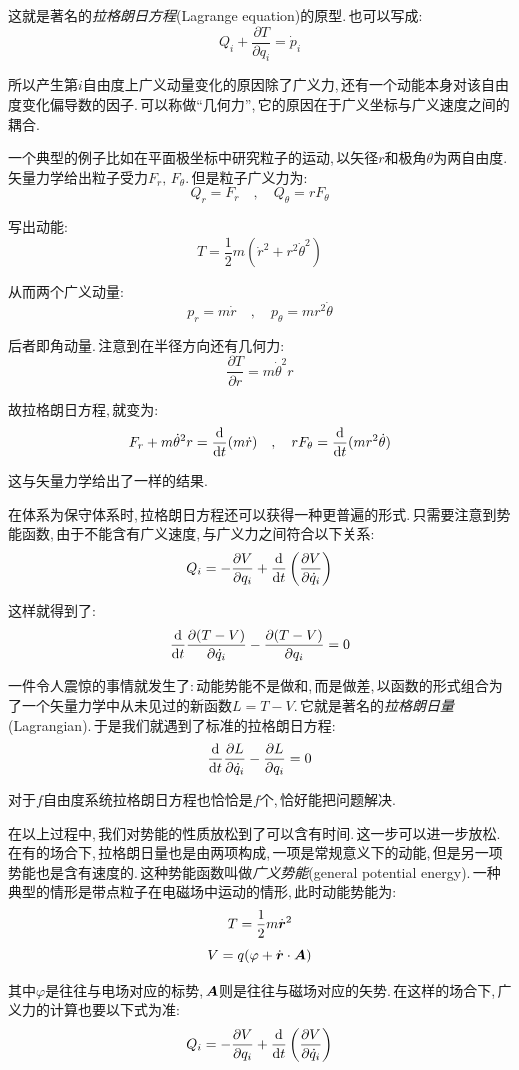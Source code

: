 这就是著名的\emph{拉格朗日方程}(Lagrange equation)的原型.\,也可以写成:
\[Q_i+\frac{\partial T}{\partial q_i}=\dot{p}_i\]

所以产生第$i$自由度上广义动量变化的原因除了广义力,\,还有一个动能本身对该自由度变化偏导数的因子.\,可以称做``几何力'',\,它的原因在于广义坐标与广义速度之间的耦合.

一个典型的例子比如在平面极坐标中研究粒子的运动,\,以矢径$r$和极角$\theta$为两自由度.\,矢量力学给出粒子受力$F_r,\,F_\theta$.\,但是粒子广义力为:
\[Q_r=F_r\quad,\quad Q_\theta=rF_\theta\]

写出动能:
\[T=\frac{1}{2}m(\dot{r}^2+r^2\dot{\theta}^2)\]

从而两个广义动量:
\[p_r=m\dot{r}\quad,\quad p_\theta=mr^2\dot{\theta}\]

后者即角动量.\,注意到在半径方向还有几何力:
\[\frac{\partial T}{\partial r}=m\dot{\theta}^2r\]

故拉格朗日方程,\,就变为:
\[F_r+m\dot{\theta}^2r=\frac{\textrm{d}}{\textrm{d} t}(m\dot{r})\quad ,\quad rF_\theta =\frac{\textrm{d}}{\textrm{d} t}(mr^2\dot{\theta})\]

这与矢量力学给出了一样的结果.

\vspace{1cm}
在体系为保守体系时,\,拉格朗日方程还可以获得一种更普遍的形式.\,只需要注意到势能函数,\,由于不能含有广义速度,\,与广义力之间符合以下关系:
\[Q_i=-\frac{\partial V}{\partial q_i}+\frac{\textrm{d} }{\textrm{d} t}\left(\frac{\partial V}{\partial \dot{q}_i}\right)\]

这样就得到了:
\[\frac{\textrm{d} }{\textrm{d} t}\frac{\partial (T-V)}{\partial \dot{q}_i}-\frac{\partial (T-V)}{\partial q_i}=0\]

一件令人震惊的事情就发生了:\,动能势能不是做和,\,而是做差,\,以函数的形式组合为了一个矢量力学中从未见过的新函数$L=T-V$.\,它就是著名的\emph{拉格朗日量}(Lagrangian).\,于是我们就遇到了标准的拉格朗日方程:
\[\frac{\textrm{d} }{\textrm{d} t}\frac{\partial L}{\partial \dot{q}_i}-\frac{\partial L}{\partial q_i}=0\]

对于$f$自由度系统拉格朗日方程也恰恰是$f$个,\,恰好能把问题解决.

在以上过程中,\,我们对势能的性质放松到了可以含有时间.\,这一步可以进一步放松.\,在有的场合下,\,拉格朗日量也是由两项构成,\,一项是常规意义下的动能,\,但是另一项势能也是含有速度的.\,这种势能函数叫做\emph{广义势能}(general potential energy).\,一种典型的情形是带点粒子在电磁场中运动的情形,\,此时动能势能为:
\[T=\frac{1}{2}m\dot{\boldsymbol{r}}^2\]
\[V=q(\varphi+\dot{\boldsymbol{r}}\cdot \boldsymbol{A})\]

其中$\varphi$是往往与电场对应的标势,\,$\boldsymbol{A}$则是往往与磁场对应的矢势.\,在这样的场合下,\,广义力的计算也要以下式为准:
\[Q_i=-\frac{\partial V}{\partial q_i}+\frac{\textrm{d} }{\textrm{d} t}\left(\frac{\partial V}{\partial \dot{q}_i}\right)\]

